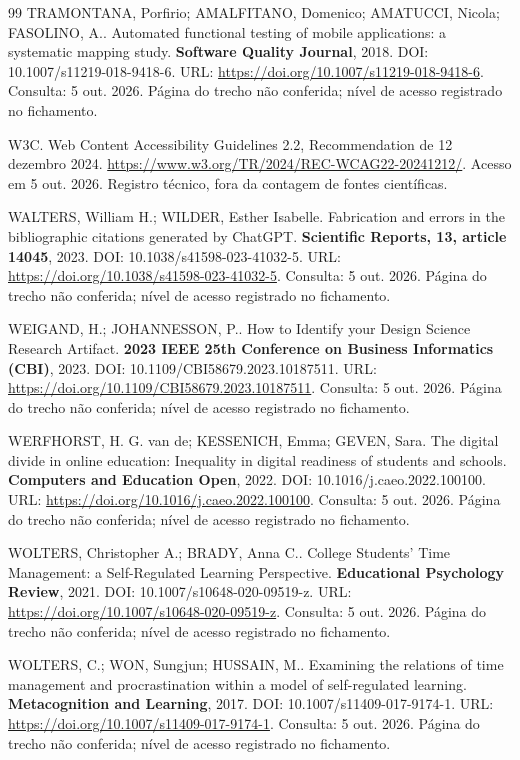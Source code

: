 \begin{thebibliography}{99}
 TRAMONTANA, Porfirio; AMALFITANO, Domenico; AMATUCCI, Nicola; FASOLINO, A.. Automated functional testing of mobile applications: a systematic mapping study. \textbf{Software Quality Journal}, 2018. DOI: 10.1007/s11219-018-9418-6. URL: \url{https://doi.org/10.1007/s11219-018-9418-6}. Consulta: 5 out. 2026. Página do trecho não conferida; nível de acesso registrado no fichamento.

 W3C. Web Content Accessibility Guidelines 2.2, Recommendation de 12 dezembro 2024. \url{https://www.w3.org/TR/2024/REC-WCAG22-20241212/}. Acesso em 5 out. 2026. Registro técnico, fora da contagem de fontes científicas.

 WALTERS, William H.; WILDER, Esther Isabelle. Fabrication and errors in the bibliographic citations generated by ChatGPT. \textbf{Scientific Reports, 13, article 14045}, 2023. DOI: 10.1038/s41598-023-41032-5. URL: \url{https://doi.org/10.1038/s41598-023-41032-5}. Consulta: 5 out. 2026. Página do trecho não conferida; nível de acesso registrado no fichamento.

 WEIGAND, H.; JOHANNESSON, P.. How to Identify your Design Science Research Artifact. \textbf{2023 IEEE 25th Conference on Business Informatics (CBI)}, 2023. DOI: 10.1109/CBI58679.2023.10187511. URL: \url{https://doi.org/10.1109/CBI58679.2023.10187511}. Consulta: 5 out. 2026. Página do trecho não conferida; nível de acesso registrado no fichamento.

 WERFHORST, H. G. van de; KESSENICH, Emma; GEVEN, Sara. The digital divide in online education: Inequality in digital readiness of students and schools. \textbf{Computers and Education Open}, 2022. DOI: 10.1016/j.caeo.2022.100100. URL: \url{https://doi.org/10.1016/j.caeo.2022.100100}. Consulta: 5 out. 2026. Página do trecho não conferida; nível de acesso registrado no fichamento.

 WOLTERS, Christopher A.; BRADY, Anna C.. College Students’ Time Management: a Self-Regulated Learning Perspective. \textbf{Educational Psychology Review}, 2021. DOI: 10.1007/s10648-020-09519-z. URL: \url{https://doi.org/10.1007/s10648-020-09519-z}. Consulta: 5 out. 2026. Página do trecho não conferida; nível de acesso registrado no fichamento.

 WOLTERS, C.; WON, Sungjun; HUSSAIN, M.. Examining the relations of time management and procrastination within a model of self-regulated learning. \textbf{Metacognition and Learning}, 2017. DOI: 10.1007/s11409-017-9174-1. URL: \url{https://doi.org/10.1007/s11409-017-9174-1}. Consulta: 5 out. 2026. Página do trecho não conferida; nível de acesso registrado no fichamento.


\end{thebibliography}
